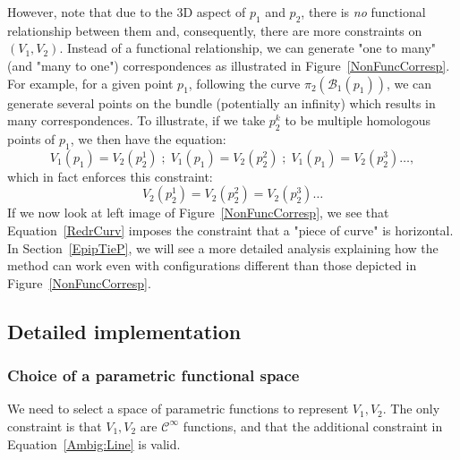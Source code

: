 \documentclass{ipol}
\newcommand{\Bund}[1]{\ensuremath{\mathcal{B}_{#1}}}
\newcommand{\BundO}{\Bund{1}}
\begin{document}
However, note that due to {the $3$D aspect} of $p_1$ and $p_2$, there is
\emph{no} functional relationship between them and, consequently,
there are more constraints on $(V_1,V_2)$. Instead of a functional relationship,
we can generate  "one to many" (and  "many to one") correspondences as illustrated in Figure~\ref{NonFuncCorresp}.
For example, for a given  point $p_1$, following the curve $\pi_2(\BundO(p_1))$, we can generate
several points on the bundle (potentially an infinity) which results in many correspondences.
To illustrate, if we take $p^k_2$ to be multiple homologous points of $p_1$,
we then have the equation:
%
\begin{equation}
    V_1(p_1) = V_2(p^1_2)   \;;\; V_1(p_1) = V_2(p^2_2)   \;;\; V_1(p_1) = V_2(p^3_2)  \dots , \label{MultiTieP}
\end{equation}
%
which in fact enforces this constraint: 
%
\begin{equation}
V_2(p^1_2) = V_2(p^2_2)  =  V_2(p^3_2) \dots \label{RedrCurv}
\end{equation}
%
If we now look at left image of Figure~\ref{NonFuncCorresp}, we see that Equation~\eqref{RedrCurv}
imposes the constraint that a "piece of curve" is horizontal.
In Section~\ref{EpipTieP}, we will see a more detailed analysis explaining how the 
method can work even with configurations different than those depicted in Figure~\ref{NonFuncCorresp}.






\subsection{Detailed implementation}


\subsubsection{Choice of a parametric functional space}
\label{ChoicePolyn}

We need to select a space of parametric functions to represent $V_1,V_2$. The only constraint
is that $V_1,V_2$ are $\mathcal{C}^{\infty}$ functions, and that the additional constraint in 
Equation~\eqref{Ambig:Line} is valid. 
\end{document}
